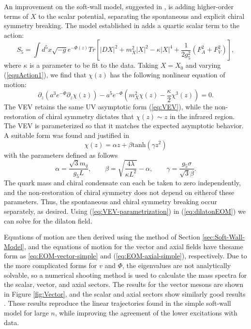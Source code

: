 An improvement on the soft-wall model, suggested in \cite{karch-katz-son-adsqcd}, is adding higher-order terms of $X$ to the scalar potential, separating the spontaneous and explicit chiral symmetry breaking. 
The model established in \cite{gherghetta-kelley} adds a quartic scalar term to the action:
\begin{equation}
S_{5}=\int d^{5}x\sqrt{-g}e^{-\Phi(z)}Tr\left[|DX|^{2}+m_{X}^{2}|X|^{2}-\kappa|X|^{4}+\frac{1}{2g_{5}^{2}}(F_{A}^{2}+F_{V}^{2})\right],\label{equAction1}
\end{equation}
where $\kappa$ is a parameter to be fit to the data.
 Taking $X=X_{0}$ and varying (\ref{equAction1}), we find that $\chi(z)$ has the following nonlinear equation of motion:
\begin{equation}
\partial_{z}(a^{3}e^{-\Phi}\partial_{z}\chi(z))-a^{5}e^{-\Phi}\left(m_{X}^{2}\chi(z)-\frac{\kappa}{2}\chi^{3}(z)\right)=0.\label{eq:dilatonEOM}
\end{equation}
The VEV retains the same UV asymptotic form (\ref{eq:VEV}), while the non-restoration of chiral symmetry dictates that $\chi(z)\sim z$ in the infrared region. 
The VEV is parameterized so that it matches the expected asymptotic behavior. 
A suitable form was found and justified in \cite{gherghetta-kelley}
\begin{equation}
\chi(z)=\alpha z+\beta \mathrm{tanh}(\gamma z^{2})\label{eq:VEV-parametrization}
\end{equation}
with the parameters defined as follows
\[
\alpha=\frac{\sqrt{3}m_{q}}{g_{5}L},\qquad\beta=\sqrt{\frac{4\lambda}{\kappa L^{2}}}-\alpha,\qquad\gamma=\frac{g_{5}\sigma}{\sqrt{3}\beta}.
\]
 The quark mass and chiral condensate can each be taken to zero independently, and the non-restoration of chiral symmetry does not depend on eitherof these parameters. 
 Thus, the spontaneous and chiral symmetry breaking occur separately, as desired. 
Using (\ref{eq:VEV-parametrization}) in (\ref{eq:dilatonEOM}) we can solve for the dilaton field.

Equations of motion are then derived using the method of Section \ref{sec:Soft-Wall-Model}, and the equations of motion for the vector and axial fields have thesame form as \ref{eq:EOM-vector-simple} and (\ref{eq:EOM-axial-simple}), respectively. 
Due to the more complicated forms for $v$ and $\Phi$, the eigenvalues are not analytically solvable, so a numerical shooting method is used to calculate the mass spectra for the scalar, vector,
and axial sectors. 
The results for the vector mesons are shown in Figure \ref{fig:Vector}, and the scalar and axial sectors show similarly good results \cite{gherghetta-kelley}. 
These results reproduce the linear trajectories found in the simple soft-wall model \cite{karch-katz-son-adsqcd} for large $n$, while improving the agreement of the lower excitations with data.

